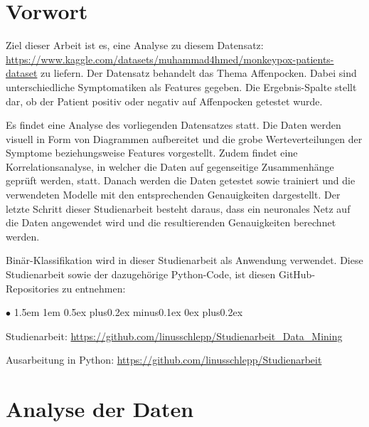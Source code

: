 \documentclass[13pt,a4paper, listof=entryprefix, bibliography=totocnumbered,toc=listofnumbered,lof=listofnumbered]{scrartcl}
\newenvironment{FHitemize}{\begin{list}{$\bullet$} {\leftmargin1.5em \labelsep1em \rightmargin0cm \parsep0.5ex plus0.2ex minus0.1ex \itemsep0ex plus0.2ex}}{\end{list}}
\begin{document}

	\section{Vorwort}
		\label{ch:vorwort}

Ziel dieser Arbeit ist es, eine Analyse zu diesem Datensatz: \linebreak \url{https://www.kaggle.com/datasets/muhammad4hmed/monkeypox-patients-dataset}  
zu liefern. Der Datensatz behandelt das Thema Affenpocken. Dabei sind unterschiedliche Symptomatiken als Features gegeben. Die Ergebnis-Spalte stellt dar, ob 
der Patient positiv oder negativ auf Affenpocken getestet wurde.

Es findet eine Analyse des vorliegenden Datensatzes statt.  Die Daten werden visuell in Form von Diagrammen aufbereitet und die grobe Werteverteilungen
der Symptome beziehungsweise Features vorgestellt. Zudem findet eine Korrelationsanalyse, in welcher die 
Daten auf gegenseitige Zusammenhänge geprüft werden, statt. Danach werden die Daten getestet sowie trainiert und die
verwendeten Modelle mit den entsprechenden Genauigkeiten dargestellt. Der letzte Schritt dieser Studienarbeit
besteht daraus, dass ein neuronales Netz auf die Daten angewendet wird und die resultierenden Genauigkeiten
berechnet werden. 

Binär-Klassifikation wird in dieser Studienarbeit als Anwendung verwendet. Diese Studienarbeit sowie der dazugehörige Python-Code, ist diesen
GitHub-Repositories zu entnehmen: 

	\begin{FHitemize}
		\item Studienarbeit: \url{https://github.com/linusschlepp/Studienarbeit_Data_Mining}
		\item Ausarbeitung in Python: \url{https://github.com/linusschlepp/Studienarbeit}
	\end{FHitemize}
	

	\section{Analyse der Daten}
		\label{ch:analyse_daten}
\end{document}
